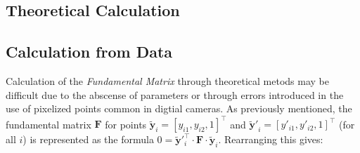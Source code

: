 \subsection{Theoretical Calculation}

\subsection{Calculation from Data}

\par Calculation of the \textit{Fundamental Matrix} through theoretical metods may be difficult due to the abscense of parameters or through errors introduced in the use of pixelized points common in digtial cameras. As previously mentioned, the fundamental matrix $\mathbf{F}$ for points $\mathbf{\tilde{y}}_i=[y_{i1},y_{i2},1]^\intercal$ and $\mathbf{\tilde{y}'}_i=[y'_{i1},y'_{i2},1]^\intercal$ (for all $i$) is represented as the formula $0=\mathbf{\tilde{y}}{'^\intercal_i}\cdot\mathbf{F}\cdot\mathbf{\tilde{y}}_i$. Rearranging this gives:

